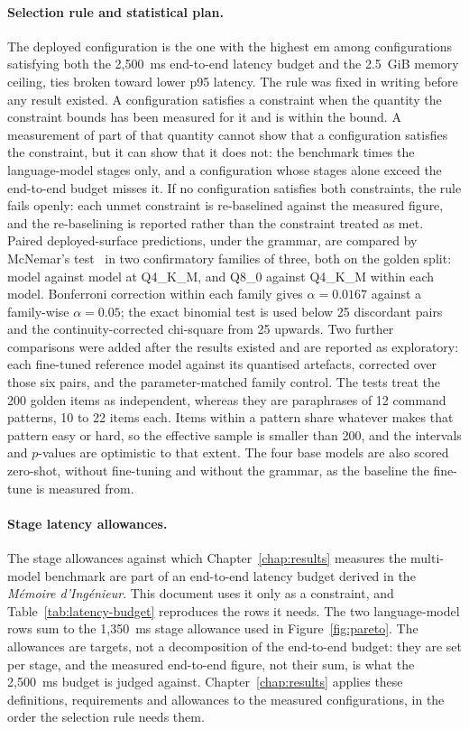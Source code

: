 \paragraph{Selection rule and statistical plan.} The deployed configuration is the one with the
highest \gls{em} among configurations satisfying both the 2{,}500~ms end-to-end latency budget and
the 2.5~GiB memory ceiling, ties broken toward lower p95 latency. The rule was fixed in writing
before any result existed. A configuration satisfies a constraint when the quantity the constraint
bounds has been measured for it and is within the bound. A measurement of part of that quantity
cannot show that a configuration satisfies the constraint, but it can show that it does not: the
benchmark times the language-model stages only, and a configuration whose stages alone exceed the
end-to-end budget misses it. If no configuration satisfies both constraints, the rule fails openly:
each unmet constraint is re-baselined against the measured figure, and the re-baselining is
reported rather than the constraint treated as met.
Paired deployed-surface predictions, under the grammar, are compared by McNemar's
test~\cite{mcnemar1947} in two confirmatory families of three, both on the golden split: model
against model at Q4\_K\_M, and Q8\_0 against Q4\_K\_M within each model. Bonferroni correction within
each family gives $\alpha = 0.0167$ against a family-wise $\alpha = 0.05$; the exact binomial test is
used below 25 discordant pairs and the continuity-corrected chi-square from 25 upwards. Two further
comparisons were added after the results existed and are reported as exploratory: each fine-tuned
reference model against its quantised artefacts, corrected over those six pairs, and the
parameter-matched family control. The tests
treat the 200 golden items as independent, whereas they are paraphrases of 12 command patterns, 10
to 22 items each. Items within a pattern share whatever makes that pattern easy or hard, so the
effective sample is smaller than 200, and the intervals and $p$-values are optimistic to that
extent.
The four base models are also scored zero-shot, without fine-tuning and without the grammar, as the
baseline the fine-tune is measured from.

\paragraph{Stage latency allowances.} The stage allowances against which
Chapter~\ref{chap:results} measures the multi-model benchmark are part of an end-to-end latency
budget derived in the \emph{M\'emoire d'Ing\'enieur}. This document uses it only as a constraint,
and Table~\ref{tab:latency-budget} reproduces the rows it needs. The two language-model rows sum to
the 1{,}350~ms stage allowance used in Figure~\ref{fig:pareto}. The allowances are targets, not a
decomposition of the end-to-end budget: they are set per stage, and the measured end-to-end figure,
not their sum, is what the 2{,}500~ms budget is judged against. Chapter~\ref{chap:results} applies
these definitions, requirements and allowances to the measured configurations, in the order the
selection rule needs them.
